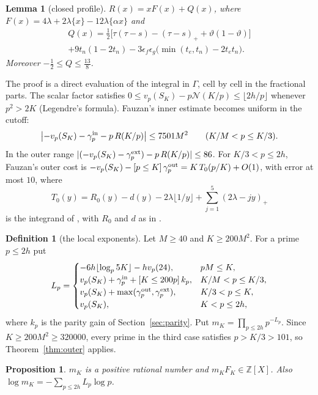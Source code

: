 \documentclass[11pt]{amsart}
\newtheorem{lemma}[theorem]{Lemma}
\newtheorem{proposition}[theorem]{Proposition}
\theoremstyle{definition}
\newtheorem{definition}[theorem]{Definition}
\theoremstyle{remark}
\numberwithin{equation}{section}
\newcommand{\Z}{\mathbb Z}
\newcommand{\fr}[1]{\{#1\}}
\begin{document}
\begin{lemma}[closed profile]\label{lem:profile}
$R(x)=xF(x)+Q(x)$, where $F(x)=4\lambda+2\lambda\fr x-12\lambda\fr{\alpha x}$ and
\begin{multline*}
 Q(x)=\tfrac12\bigl[\tau(\tau-s)-(\tau-s)_++\vartheta(1-\vartheta)\bigr]\\
 +9t_n(1-2t_n)-3\epsilon_f\epsilon_g\bigl(\min(t_e,t_n)-2t_et_n\bigr).
\end{multline*}
Moreover $-\frac12\le Q\le\frac{13}8$.
\end{lemma}

The proof is a direct evaluation of the integral in $\Gamma$, cell by cell in the fractional parts. The scalar factor
satisfies $0\le v_p(S_K)-p\mathcal N(K/p)\le\lfloor2h/p\rfloor$ whenever $p^2>2K$ (Legendre's formula). Fauzan's inner
estimate becomes uniform in the cutoff:
\begin{equation}\label{eq:innerunif}
 \bigl|-v_p(S_K)-\gamma^{\rm in}_p-p\,R(K/p)\bigr|\le7501M^2\qquad(K/M<p\le K/3).
\end{equation}
In the outer range $|(-v_p(S_K)-\gamma^{\rm ext}_p)-p\,R(K/p)|\le86$. For $K/3<p\le2h$, Fauzan's outer cost is
$-v_p(S_K)-[p\le K]\,\gamma^{\rm out}_p=K\,T_0(p/K)+O(1)$, with error at most $10$, where
\[
 T_0(y)=R_0(y)-d(y)-2\lambda\lfloor1/y\rfloor+\sum_{j=1}^5(2\lambda-jy)_+
\]
is the integrand of \cite[(5.10)]{Fauzan2026}, with $R_0$ and $d$ as in \cite[(5.8), (5.9)]{Fauzan2026}.

\begin{definition}[the local exponents]\label{def:LpC}
Let $M\ge40$ and $K\ge200M^2$. For a prime $p\le2h$ put
\[
 L_p=\begin{cases}
 -6h\lfloor\log_p5K\rfloor-hv_p(24), & pM\le K,\\
 v_p(S_K)+\gamma^{\rm in}_p+[K\le200p]\,k_p, & K/M<p\le K/3,\\
 v_p(S_K)+\max(\gamma^{\rm out}_p,\gamma^{\rm ext}_p), & K/3<p\le K,\\
 v_p(S_K), & K<p\le2h,
 \end{cases}
\]
where $k_p$ is the parity gain of Section~\ref{sec:parity}. Put $m_K=\prod_{p\le2h}p^{-L_p}$. Since
$K\ge200M^2\ge320000$, every prime in the third case satisfies $p>K/3>101$, so Theorem~\ref{thm:outer} applies.
\end{definition}

\begin{proposition}\label{prop:normaliser}
$m_K$ is a positive rational number and $m_KF_K\in\Z[X]$. Also $\log m_K=-\sum_{p\le2h}L_p\log p$.
\end{proposition}
\end{document}
